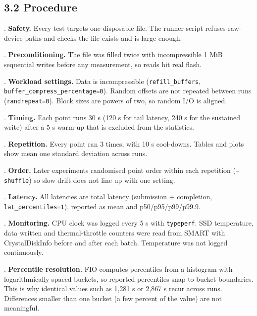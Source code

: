 \documentclass[10pt,letterpaper]{article}
\begin{document}
\subsection*{3.2 Procedure}

. \textbf{Safety.} Every test targets one disposable file. The runner script refuses raw-device paths and checks the file exists and is large enough.\par\smallskip

. \textbf{Preconditioning.} The file was filled twice with incompressible 1 MiB sequential writes before any measurement, so reads hit real flash.\par\smallskip

. \textbf{Workload settings.} Data is incompressible (\texttt{refill\_buffers}, \texttt{buffer\_compress\_percentage=0}). Random offsets are not repeated between runs (\texttt{randrepeat=0}). Block sizes are powers of two, so random I/O is aligned.\par\smallskip

. \textbf{Timing.} Each point runs 30 s (120 s for tail latency, 240 s for the sustained write) after a 5 s warm-up that is excluded from the statistics.\par\smallskip

. \textbf{Repetition.} Every point ran 3 times, with 10 s cool-downs. Tables and plots show mean \textpm{} one standard deviation across runs.\par\smallskip

. \textbf{Order.} Later experiments randomised point order within each repetition (\texttt{--shuffle}) so slow drift does not line up with one setting.\par\smallskip

. \textbf{Latency.} All latencies are total latency (submission + completion, \texttt{lat\_percentiles=1}), reported as mean and p50/p95/p99/p99.9.\par\smallskip

. \textbf{Monitoring.} CPU clock was logged every 5 s with \texttt{typeperf}. SSD temperature, data written and thermal-throttle counters were read from SMART with CrystalDiskInfo before and after each batch. Temperature was not logged continuously.\par\smallskip

. \textbf{Percentile resolution.} FIO computes percentiles from a histogram with logarithmically spaced buckets, so reported percentiles snap to bucket boundaries. This is why identical values such as 1,281 \textmu{}s or 2,867 \textmu{}s recur across runs. Differences smaller than one bucket (a few percent of the value) are not meaningful.\par\smallskip
\end{document}
